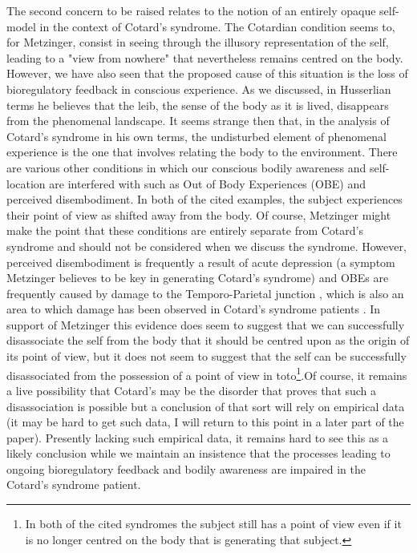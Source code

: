 The second concern to be raised relates to the notion of an entirely opaque self-model in the context of Cotard's syndrome. The Cotardian condition seems to, for Metzinger, consist in seeing through the illusory representation of the self, leading to a "view from nowhere" \cite[p. 88]{grush2000} that nevertheless remains centred on the body. However, we have also seen that the proposed cause of this situation is the loss of bioregulatory feedback in conscious experience. As we discussed, in Husserlian terms he believes that the leib, the sense of the body as it is lived, disappears from the phenomenal landscape. It seems strange then that, in the analysis of Cotard's syndrome in his own terms, the undisturbed element of phenomenal experience is the one that involves relating the body to the environment. There are various other conditions in which our conscious bodily awareness and self-location are interfered with such as Out of Body Experiences (OBE) and perceived disembodiment. In both of the cited examples, the subject experiences their point of view as shifted away from the body. Of course, Metzinger might make the point that these conditions are entirely separate from Cotard's syndrome and should not be considered when we discuss the syndrome. However, perceived disembodiment is frequently a result of acute depression (a symptom Metzinger believes to be key in generating Cotard's syndrome) and OBEs are frequently caused by damage to the Temporo-Parietal junction \cite{blanke2005}, which is also an area to which damage has been observed in Cotard's syndrome patients \cite{enoch1991,young1995}. In support of Metzinger this evidence does seem to suggest that we can successfully disassociate the self from the body that it should be centred upon as the origin of its point of view, but it does not seem to suggest that the self can be successfully disassociated from the possession of a point of view in toto\footnote{In both of the cited syndromes the subject still has a point of view even if it is no longer centred on the body that is generating that subject.}.Of course, it remains a live possibility that Cotard's may be the disorder that proves that such a disassociation is possible but a conclusion of that sort will rely on empirical data (it may be hard to get such data, I will return to this point in a later part of the paper). Presently lacking such empirical data, it remains hard to see this as a likely conclusion while we maintain an insistence that the processes leading to ongoing bioregulatory feedback and bodily awareness are impaired in the Cotard's syndrome patient.

